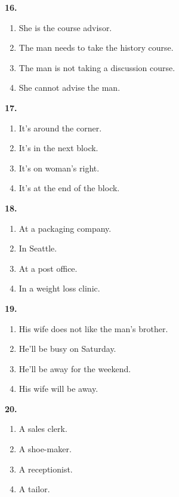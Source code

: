 \documentclass[12pt]{article}
\begin{document}
\par
\vspace{0.25\baselineskip}
\noindent\textbf{16.}
\begin{enumerate}[label=(\Alph*),leftmargin=*,itemsep=0.2em]
\item She is the course advisor.
\item The man needs to take the history course.
\item The man is not taking a discussion course.
\item She cannot advise the man.
\end{enumerate}
\par
\vspace{0.25\baselineskip}
\noindent\textbf{17.}
\begin{enumerate}[label=(\Alph*),leftmargin=*,itemsep=0.2em]
\item It's around the corner.
\item It's in the next block.
\item It's on woman's right.
\item It's at the end of the block.
\end{enumerate}
\par
\vspace{0.25\baselineskip}
\noindent\textbf{18.}
\begin{enumerate}[label=(\Alph*),leftmargin=*,itemsep=0.2em]
\item At a packaging company.
\item In Seattle.
\item At a post office.
\item In a weight loss clinic.
\end{enumerate}
\par
\vspace{0.25\baselineskip}
\noindent\textbf{19.}
\begin{enumerate}[label=(\Alph*),leftmargin=*,itemsep=0.2em]
\item His wife does not like the man's brother.
\item He'll be busy on Saturday.
\item He'll be away for the weekend.
\item His wife will be away.
\end{enumerate}
\par
\vspace{0.25\baselineskip}
\noindent\textbf{20.}
\begin{enumerate}[label=(\Alph*),leftmargin=*,itemsep=0.2em]
\item A sales clerk.
\item A shoe-maker.
\item A receptionist.
\item A tailor.
\end{enumerate}
\end{document}
